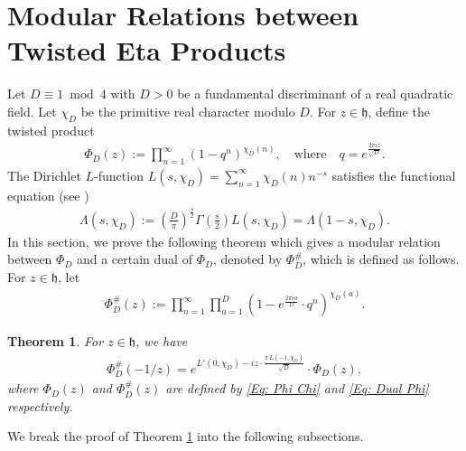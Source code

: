 \documentclass[11pt]{amsart}
\numberwithin{equation}{section}
\newtheorem{thm}{Theorem}[section]
\theoremstyle{remark}
\begin{document}
\section{Modular Relations between Twisted Eta Products} \label{sec: Phi Modular Relation} Let $D\equiv 1\bmod{4}$ with $D>0$ be a fundamental discriminant of a real quadratic field. Let ${\chi_{D}}$ be the primitive real character modulo $D$. For $z \in \mathfrak{h}$, define the twisted product
\begin{align}\label{Eq: Phi Chi}
\Phi_{D}(z) := \prod_{n=1}^\infty \left(1-q^n   \right)^{{\chi_{D}}(n)}, \quad \textrm{where} \quad q = e^{\frac{2 \pi i z}{\sqrt{D}}}.
\end{align}
The Dirichlet $L$-function 
$L(s,{\chi_{D}}) =\sum\limits_{n=1}^\infty {\chi_{D}}(n) n^{-s}$ satisfies the functional equation (see \cite[Ch. 5]{IK2004})
\begin{align} \label{FunctionalEquationForL(s,chi)}
\Lambda(s,{\chi_{D}}) := \left(\frac{D}{\pi} \right)^{\tfrac{s}{2}} \Gamma\left(\frac{s}{2} \right) L(s,{\chi_{D}}) =  \Lambda(1-s,{\chi_{D}}).
\end{align}
In this section, we prove the following theorem which gives a modular relation between $\Phi_{D}$ and a certain dual of $\Phi_{D}$, denoted by $\Phi^\#_{D}$, which is defined as follows. For $z \in \mathfrak{h}$, let
\begin{align}\label{Eq: Dual Phi}
\Phi^\#_{D}(z) := \prod_{n=1}^\infty \prod_{a=1}^D \left(1-  e^{\frac{2\pi ia}{D}}\cdot q^n  \right)^{{\chi_{D}}(a)}.
\end{align}
\begin{thm} \label{Thm : Modular Relation} For $z\in \mathfrak{h}$, we have
\begin{align}\label{Thm: Modular Relation}
\Phi^\#_{D}(-1/z) = e^{L'(0,{\chi_{D}})-iz\cdot\frac{\pi \, L(-1,{\chi_D})}{\sqrt{D}}}\cdot \Phi_{D}(z),
\end{align}
where $\Phi_{D}(z)$ and $\Phi^\#_{D}(z)$ are defined by \eqref{Eq: Phi Chi} and \eqref{Eq: Dual Phi} respectively.
\end{thm}
We break the proof of Theorem \ref{Thm : Modular Relation} into the following subsections.
\end{document}
